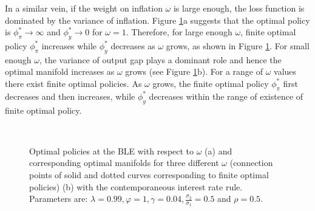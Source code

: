 In a similar vein, if the weight on inflation $\omega$ is large enough, the loss function is dominated by the variance of inflation. Figure \ref{optomega}a suggests that the optimal policy is $\phi_\pi^*\to\infty$ and $\phi_y^*\to 0$ for $\omega=1$. Therefore, for large enough $\omega$, finite optimal policy $\phi_\pi^*$ increases while  $\phi_y^*$ decreases as $\omega$ grows, as shown in Figure \ref{optomega}. For small enough $\omega$, the variance of output gap plays a dominant role and hence the optimal manifold increases as $\omega$ grows (see Figure \ref{optomega}b). For a range of  $\omega$ values there exist finite optimal policies. As $\omega$ grows, the finite optimal policy $\phi_\pi^*$ first decreases and then increases, while $\phi_y^*$ decreases  within the range of existence of finite optimal policy.




\begin{figure}
    \begin{center}
        \mbox{\quad
        }
   \end{center}
   \caption{\label{optomega}  Optimal policies at the BLE with respect to $\omega$ (a) and corresponding optimal manifolds for three different $\omega$ (connection points of solid and dotted curves corresponding to finite optimal policies) (b) with the contemporaneous interest rate rule. Parameters are: $\lambda=0.99, \varphi=1, \gamma=0.04,\frac{\sigma_2}{\sigma_1}=0.5$ and $\rho=0.5$.}
    \end{figure}
    
